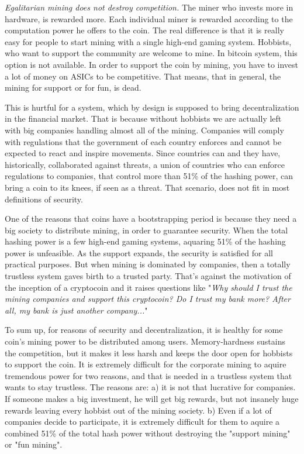\emph{Egalitarian mining does not destroy competition.} The miner who invests more in hardware, is rewarded more. Each individual miner is rewarded according to the computation power he offers to the coin. The real difference is that it is really easy for people to start mining with a single high-end gaming system. Hobbists, who want to support the community are welcome to mine. In bitcoin system, this option is not available. In order to support the coin by mining, you have to invest a lot of money on ASICs to be competitive. That means, that in general, the mining for support or for fun, is dead.

This is hurtful for a system, which by design is supposed to bring decentralization in the financial market. That is because without hobbists we are actually left with big companies handling almost all of the mining. Companies will comply with regulations that the government of each country enforces and cannot be expected to react and inspire movements. Since countries can and they have, historically, collaborated against threats, a union of countries who can enforce regulations to companies, that control more than 51\% of the hashing power, can bring a coin to its knees, if seen as a threat. That scenario, does not fit in most definitions of security.

One of the reasons that coins have a bootstrapping period is because they need a big society to distribute mining, in order to guarantee security. When the total hashing power is a few high-end gaming systems, aquaring 51\% of the hashing power is unfeasible. As the support expands, the security is satisfied for all practical purposes. But when mining is dominated by companies, then a totally trustless system gaves birth to a trusted party. That's against the motivation of the inception of a cryptocoin and it raises questions like "\emph{Why should I trust the mining companies and support this cryptocoin? Do I trust my bank more? After all, my bank is just another company...}"

To sum up, for reasons of security and decentralization, it is healthy for some coin's mining power to be distributed among users. Memory-hardness sustains the competition, but it makes it less harsh and keeps the door open for hobbists to support the coin. It is extremely difficult for the corporate mining to aquire tremendous power for two reasons, and that is needed in a trustless system that wants to stay trustless. The reasons are: a) it is not that lucrative for companies. If someone makes a big investment, he will get big rewards, but not insanely huge rewards leaving every hobbist out of the mining society. b) Even if a lot of companies decide to participate, it is extremely difficult for them to aquire a combined 51\% of the total hash power without destroying the "support mining" or "fun mining".

